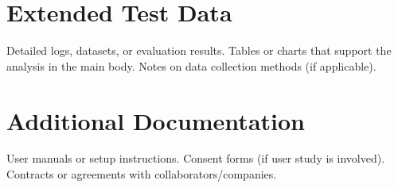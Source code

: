 \documentclass[12pt]{article}
\begin{document}
\section{Extended Test Data}
Detailed logs, datasets, or evaluation results. Tables or charts that support the analysis in the main body. Notes on data collection methods (if applicable).

\section{Additional Documentation}
User manuals or setup instructions. Consent forms (if user study is involved). Contracts or agreements with collaborators/companies.
\end{document}

